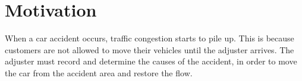 \section{Motivation}
When a car accident occurs,
traffic congestion starts to pile up.
This is because
customers are not allowed to move their vehicles until the adjuster arrives.
The adjuster must record and determine the causes of the accident,
in order to move the car from the accident area
and restore the flow.
